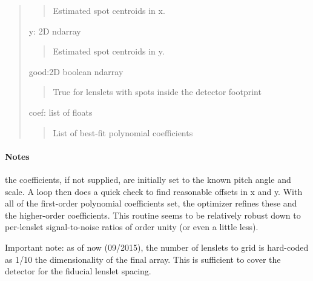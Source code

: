 \documentclass[letterpaper,10pt,english]{sphinxmanual}
\begin{document}
\begin{fulllineitems}
\begin{quote}
\begin{description}
\begin{quote}
Estimated spot centroids in x.
\end{quote}

y: 2D ndarray
\begin{quote}

Estimated spot centroids in y.
\end{quote}

good:2D boolean ndarray
\begin{quote}

True for lenslets with spots inside the detector footprint
\end{quote}

coef: list of floats
\begin{quote}

List of best-fit polynomial coefficients
\end{quote}

\end{description}\end{quote}
\paragraph{Notes}

the coefficients, if not supplied, are initially set to the 
known pitch angle and scale.  A loop then does a quick check to find
reasonable offsets in x and y.  With all of the first-order polynomial
coefficients set, the optimizer refines these and the higher-order
coefficients.  This routine seems to be relatively robust down to
per-lenslet signal-to-noise ratios of order unity (or even a little 
less).

Important note: as of now (09/2015), the number of lenslets to grid
is hard-coded as 1/10 the dimensionality of the final array.  This is
sufficient to cover the detector for the fiducial lenslet spacing.

\end{fulllineitems}

\end{document}
